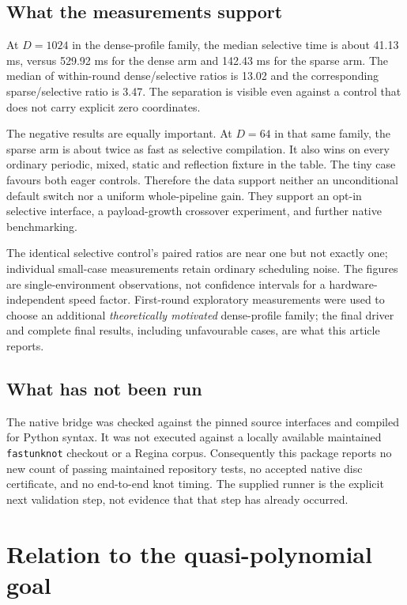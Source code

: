 \documentclass[11pt]{article}
\theoremstyle{definition}\newtheorem{definition}[theorem]{Definition}
\theoremstyle{remark}\newtheorem{remark}[theorem]{Remark}
\begin{document}


\subsection{What the measurements support}
At $D=1024$ in the dense-profile family, the median selective time is about
41.13 ms, versus 529.92 ms for the dense arm and 142.43 ms for the sparse arm.
The median of within-round dense/selective ratios is 13.02 and the corresponding
sparse/selective ratio is 3.47. The separation is visible even against a control
that does not carry explicit zero coordinates.

The negative results are equally important. At $D=64$ in that same family,
the sparse arm is about twice as fast as selective compilation. It also wins
on every ordinary periodic, mixed, static and reflection fixture in the table.
The tiny case favours both eager controls. Therefore the data support neither
an unconditional default switch nor a uniform whole-pipeline gain. They support
an opt-in selective interface, a payload-growth crossover experiment, and further
native benchmarking.

The identical selective control's paired ratios are near one but not exactly
one; individual small-case measurements retain ordinary scheduling noise.
The figures are single-environment observations, not confidence intervals for a
hardware-independent speed factor. First-round exploratory measurements were
used to choose an additional \emph{theoretically motivated} dense-profile family;
the final driver and complete final results, including unfavourable cases, are
what this article reports.

\subsection{What has not been run}
The native bridge was checked against the pinned source interfaces and compiled
for Python syntax. It was not executed against a locally available maintained
\texttt{fastunknot} checkout or a Regina corpus. Consequently this package reports
no new count of passing maintained repository tests, no accepted native disc
certificate, and no end-to-end knot timing. The supplied
 runner is the explicit next validation step,
not evidence that that step has already occurred.

\section{Relation to the quasi-polynomial goal}
\label{sec:global}
\end{document}
